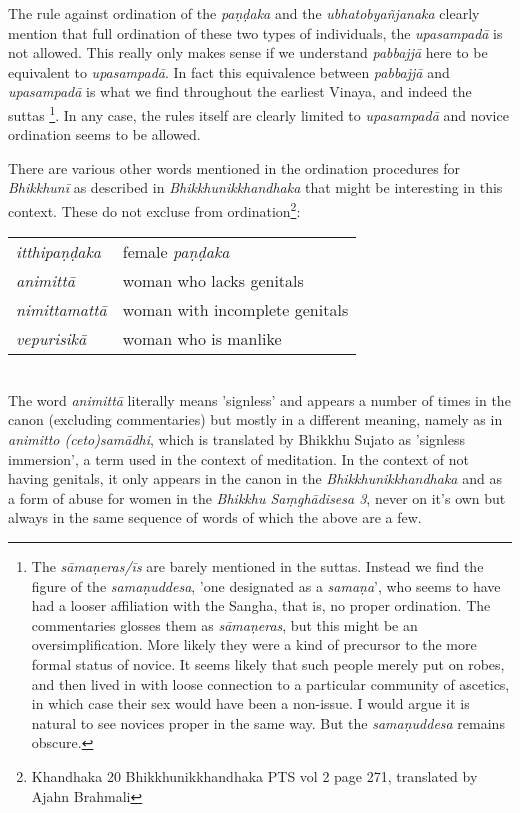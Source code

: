 The rule against ordination of the {\em paṇḍaka} and the {\em ubhatob­yañ­janaka} clearly mention that full ordination of these two types of individuals, the {\em upasampadā} is not allowed. This really only makes sense if we understand {\em pabbajjā} here to be equivalent to {\em upasampadā}. In fact this equivalence between {\em pabbajjā} and {\em upasampadā} is what we find throughout the earliest Vinaya, and indeed the suttas \footnote{The {\em sāmaṇeras/īs} are barely mentioned in the suttas. Instead we find the figure of the {\em samaṇuddesa}, 'one designated as a {\em samaṇa}', who seems to have had a looser affiliation with the Sangha, that is, no proper ordination. The commentaries glosses them as {\em sāmaṇeras}, but this might be an oversimplification. More likely they were a kind of precursor to the more formal status of novice. It seems likely that such people merely put on robes, and then lived in with loose connection to a particular community of ascetics, in which case their sex would have been a non-issue. I would argue it is natural to see novices proper in the same way. But the {\em samaṇuddesa} remains obscure.}. In any case, the rules itself are clearly limited to {\em upasampadā} and novice ordination seems to be allowed.

There are various other words mentioned in the ordination procedures for {\em Bhikkhunī} as described in {\em Bhikkhunikkhandhaka} that might be interesting in this context. These do not excluse from ordination\footnote{Khandhaka 20 Bhikkhunikkhandhaka PTS vol 2 page 271, translated by Ajahn Brahmali}: \\

\begin{tabular}{ l l }
 {\em itthipaṇḍaka} & female {\em paṇḍaka} \\
 {\em animittā } & woman who lacks genitals \\
 {\em nimittamattā } & woman with incomplete genitals \\ 
 {\em vepurisikā } & woman who is manlike \\
\end{tabular} \\

The word {\em animittā} literally means 'signless' and appears a number of times in the canon (excluding commentaries) but mostly in a different meaning, namely as in {\em animitto (ceto)samādhi}, which is translated by Bhikkhu Sujato as 'signless immersion', a term used in the context of meditation. In the context of not having genitals, it only appears in the canon in the {\em Bhikkhunikkhandhaka} and as a form of abuse for women in the {\em Bhikkhu Saṃ­ghā­di­sesa­ 3}, never on it's own but always in the same sequence of words of which the above are a few.

